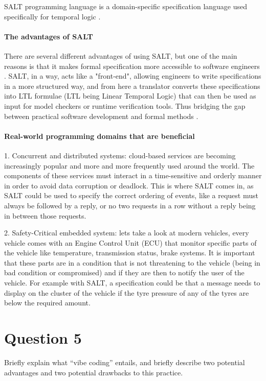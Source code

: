 \documentclass{article}
\begin{document}
SALT programming language is a domain-specific specification language used specifically for temporal logic \cite{salt-lubeck}.

\paragraph{The advantages of SALT}

There are several different advantages of using SALT, but one of the main reasons is that it makes formal specification more accessible to software engineers \cite{salt-lubeck}. SALT, in a way, acts like a "front-end", allowing engineers to write specifications in a more structured way, and from here a translator converts these specifications into LTL formulae (LTL being Linear Temporal Logic) that can then be used as input for model checkers or runtime verification tools. Thus bridging the gap between practical software development and formal methods \cite{salt-lubeck}.

\paragraph{Real-world programming domains that are beneficial}

1. Concurrent and distributed systems: cloud-based services are becoming increasingly popular and more and more frequently used around the world. The components of these services must interact in a time-sensitive and orderly manner in order to avoid data corruption or deadlock. This is where SALT comes in, as SALT could be used to specify the correct ordering of events, like a request must always be followed by a reply, or no two requests in a row without a reply being in between those requests.

2. Safety-Critical embedded system: lets take a look at modern vehicles, every vehicle comes with an Engine Control Unit (ECU) that monitor specific parts of the vehicle like temperature, transmission status, brake systems. It is important that these parts are in a condition that is not threatening to the vehicle (being in bad condition or compromised) and if they are then to notify the user of the vehicle. For example with SALT, a specification could be that a message needs to display on the cluster of the vehicle if the tyre pressure of any of the tyres are below the required amount.

\section{Question 5} Briefly explain what “vibe coding” entails, and briefly describe two potential advantages and two potential drawbacks to this practice.
\end{document}
